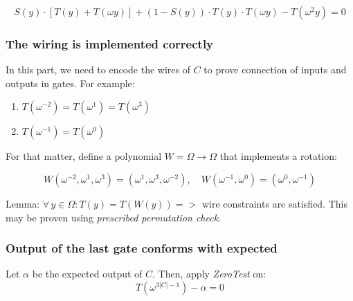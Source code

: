 \documentclass[../lecture-notes.tex]{subfiles}
\begin{document}
\[S(y) \cdot [T(y) + T(\omega y)] + (1 - S(y)) \cdot T(y) \cdot T(\omega y) - T(\omega^2 y) = 0\]

\subsubsection{The wiring is implemented correctly}
In this part, we need to encode the wires of \(C\) to prove connection of inputs and outputs in gates. For example:

\begin{enumerate}
    \item \(T(\omega^{-2}) = T(\omega^{1}) = T(\omega^{3})\)
    \item \(T(\omega^{-1}) = T(\omega^{0})\)
\end{enumerate}

For that matter, define a polynomial \(W = \Omega \to \Omega\) that implements a rotation:

\[W(\omega^{-2}, \omega^{1}, \omega^{3}) = (\omega^{1}, \omega^{3}, \omega^{-2}), \quad W(\omega^{-1}, \omega^{0}) = (\omega^{0}, \omega^{-1})\]

\begin{remark}
Lemma: \(\forall \, y \in \Omega : T(y) = T(W(y)) =>\) wire constraints are satisfied. This may be proven using \textit{prescribed permutation check}.
\end{remark}

\subsubsection{Output of the last gate conforms with expected}

Let \(\alpha\) be the expected output of \(C\). Then, apply \textit{ZeroTest} on:
\[T(\omega^{3 |C| - 1}) - \alpha = 0\]
\end{document}
